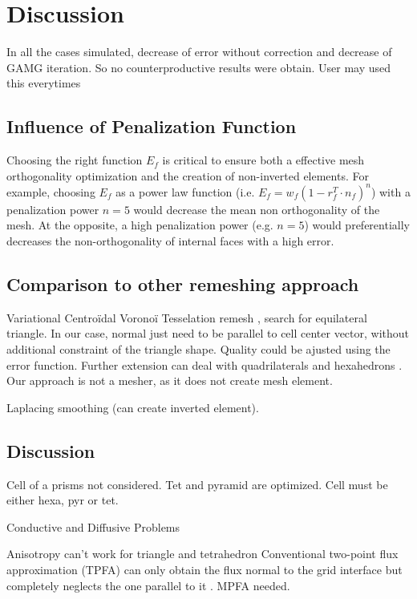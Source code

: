 \documentclass[11pt]{article}
\begin{document}
\section{Discussion}

In all the cases simulated, decrease of error without correction and decrease of GAMG iteration. 
So no counterproductive results were obtain.
User may used this everytimes

\subsection{Influence of Penalization Function}

Choosing the right function $E_f$ is critical to ensure both a effective mesh orthogonality optimization and the creation of non-inverted elements. 
For example, choosing $E_f$ as a power law function (i.e. $E_f=w_f (1-r_f^T\cdot n_f)^n$) with a penalization power $n=5$ would decrease the mean non orthogonality of the mesh.
At the opposite, a high penalization power (e.g. $n=5$) would preferentially decreases the non-orthogonality of internal faces with a high error.


\subsection{Comparison to other remeshing approach}

Variational Centroïdal Voronoï Tesselation remesh \cite{levy}, search for equilateral triangle. 
In our case, normal just need to be parallel to cell center vector, without additional constraint of the triangle shape.
Quality could be ajusted using the error function.
Further extension can deal with quadrilaterals and hexahedrons \cite{levy}.
Our approach is not a mesher, as it does not create mesh element.

Laplacing smoothing (can create inverted element).


\subsection{Discussion}

Cell of a prisms not considered. Tet and pyramid are optimized. Cell must be either hexa, pyr or tet.

Conductive and Diffusive Problems

Anisotropy can't work for triangle and tetrahedron
Conventional two-point flux approximation (TPFA) can only obtain the flux normal to the grid interface but completely neglects the one parallel to it \cite{}. MPFA needed. %
\end{document}
